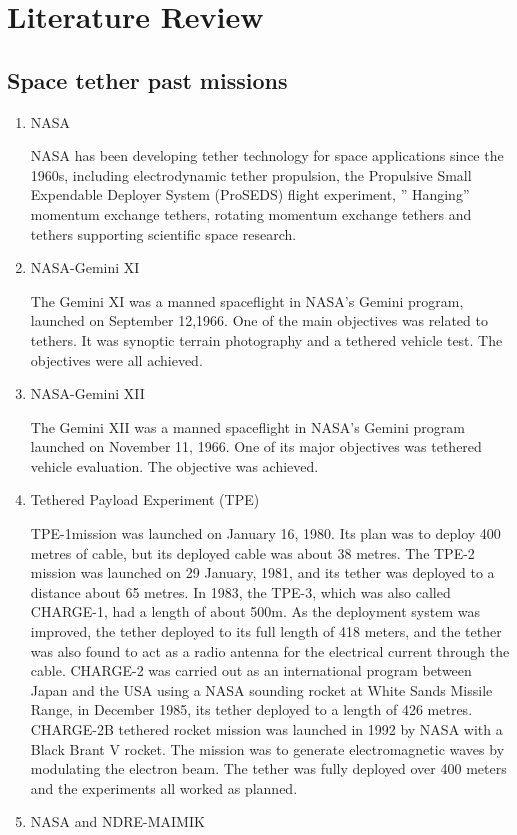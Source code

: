 \chapter{Literature Review}\label{sec-literature}
\section{Space tether past missions}
\begin{enumerate} 


\item{NASA}
 
NASA has been developing tether technology for space applications since the 1960s, including electrodynamic tether propulsion, the Propulsive Small Expendable Deployer System (ProSEDS) flight experiment, ” Hanging” momentum exchange tethers, rotating momentum exchange tethers and tethers supporting scientific space research. 

\item{NASA-Gemini XI} 

The Gemini XI was a manned spaceflight in NASA’s Gemini program, launched on September 12,1966. One of the main objectives was related to tethers. It was synoptic terrain photography and a tethered vehicle test. The objectives were all achieved. 

\item{NASA-Gemini XII} 
   
The Gemini XII was a manned spaceflight in NASA’s Gemini program launched on November 11, 1966. One of its major objectives was tethered vehicle evaluation. The objective was achieved.
\item{Tethered Payload Experiment (TPE)}

TPE-1mission was launched on January 16, 1980. Its plan was to deploy 400 metres of cable, but its deployed cable was about 38 metres. The TPE-2 mission was launched on 29 January, 1981, and its tether was deployed to a distance about 65 metres. In 1983, the TPE-3, which was also called CHARGE-1, had a length of about 500m. As the deployment system was improved, the tether deployed to its full length of 418 meters, and the tether was also found to act as a radio antenna for the electrical current through the cable. CHARGE-2 was carried out as an international program between Japan and the USA using a NASA sounding rocket at White Sands Missile Range, in December 1985, its tether deployed to a length of 426 metres.
CHARGE-2B tethered rocket mission was launched in 1992 by NASA with a Black Brant V rocket. The mission was to generate electromagnetic waves by modulating the electron beam. The tether was fully deployed over 400 meters and the experiments all worked as planned.
\item{NASA and NDRE-MAIMIK}


\end{enumerate}
